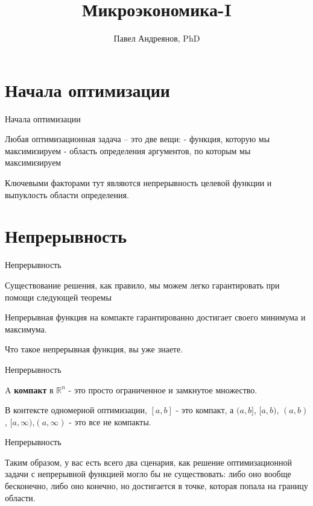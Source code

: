 \documentclass{beamer}
\title{
Микроэкономика-I
}
\author{
Павел Андреянов, PhD
}
\begin{document}
\maketitle

\section{Начала оптимизации}

\begin{frame}{Начала оптимизации}

Любая оптимизационная задача – это две вещи:
- функция, которую мы максимизируем
- область определения аргументов, по которым мы максимизируем

Ключевыми факторами тут являются непрерывность целевой функции и выпуклость области определения.

\end{frame}

\section{Непрерывность}

\begin{frame}{Непрерывность}

Существование решения, как правило, мы можем легко гарантировать при помощи следующей теоремы

\begin{theorem}[Вейерштрасса]

Непрерывная функция на компакте гарантированно достигает своего минимума и максимума.
\end{theorem}

Что такое непрерывная функция, вы уже знаете.

\end{frame}

\begin{frame}{Непрерывность}

A \textbf{компакт} в $\mathbb{R}^n$ - это просто ограниченное и замкнутое множество. 

В контексте одномерной оптимизации, $[a,b]$ - это компакт, а $(a,b]$, $[a,b)$, $(a,b)$, $[a,\infty)$,$(a,\infty)$ - это все не компакты. 

\end{frame}

\begin{frame}{Непрерывность}

Таким образом, у вас есть всего два сценария, как решение оптимизационной задачи с непрерывной функцией могло бы не существовать: либо оно вообще бесконечно, либо оно конечно, но достигается в точке, которая попала на границу области.

\end{frame}
\end{document}
